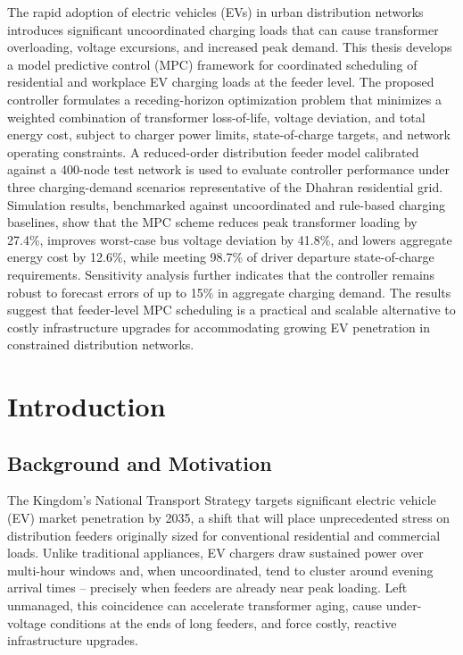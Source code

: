 \documentclass[12pt,twoside]{report}
\begin{document}
\vspace{0.5cm}
The rapid adoption of electric vehicles (EVs) in urban distribution networks introduces
significant uncoordinated charging loads that can cause transformer overloading, voltage
excursions, and increased peak demand. This thesis develops a model predictive control (MPC)
framework for coordinated scheduling of residential and workplace EV charging loads at the
feeder level. The proposed controller formulates a receding-horizon optimization problem that
minimizes a weighted combination of transformer loss-of-life, voltage deviation, and total
energy cost, subject to charger power limits, state-of-charge targets, and network operating
constraints. A reduced-order distribution feeder model calibrated against a 400-node test
network is used to evaluate controller performance under three charging-demand scenarios
representative of the Dhahran residential grid. Simulation results, benchmarked against
uncoordinated and rule-based charging baselines, show that the MPC scheme reduces peak
transformer loading by 27.4\%, improves worst-case bus voltage deviation by 41.8\%, and lowers
aggregate energy cost by 12.6\%, while meeting 98.7\% of driver departure state-of-charge
requirements. Sensitivity analysis further indicates that the controller remains robust to
forecast errors of up to 15\% in aggregate charging demand. The results suggest that
feeder-level MPC scheduling is a practical and scalable alternative to costly infrastructure
upgrades for accommodating growing EV penetration in constrained distribution networks.

\newpage
{}

\chapter{Introduction}
\label{ch:intro}

\section{Background and Motivation}
The Kingdom's National Transport Strategy targets significant electric vehicle (EV) market
penetration by 2035, a shift that will place unprecedented stress on distribution feeders
originally sized for conventional residential and commercial loads. Unlike traditional
appliances, EV chargers draw sustained power over multi-hour windows and, when uncoordinated,
tend to cluster around evening arrival times -- precisely when feeders are already near peak
loading. Left unmanaged, this coincidence can accelerate transformer aging, cause under-voltage
conditions at the ends of long feeders, and force costly, reactive infrastructure upgrades.
\end{document}
